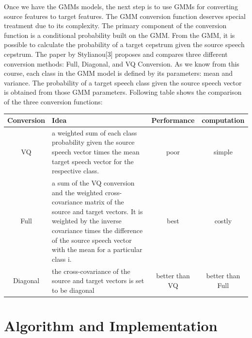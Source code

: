 \documentclass{article}
\begin{document}
Once we have the GMMs models, the next step is to use GMMs for converting source features to target features. The GMM conversion function deserves special treatment due to its complexity. The primary component of the conversion function is a conditional probability built on the GMM. From the GMM, it is possible to calculate the probability of a target cepstrum given the source speech cepstrum. The paper by Stylianou[3] proposes and compares three different conversion methods: Full, Diagonal, and VQ Conversion. As we know from this course, each class in the GMM model is defined by its parameters: mean and variance. The probability of a target speech class given the source speech vector is obtained from those GMM parameters. Following table shows the comparison of the three conversion functions:

\begin{center}
    \begin{tabular}{ | c | p{6.5cm}  | c | c |}
    \hline
    Conversion & Idea & Performance & computation\\ \hline
    VQ & a weighted sum of each class probability given the source speech vector times the mean target speech vector for the respective class. & poor & simple\\ \hline
    Full & a sum of the VQ conversion and the weighted cross-covariance matrix of the source and target vectors. It is weighted by the inverse covariance times the difference of the source speech vector with the mean for a particular class i. & best & costly\\ \hline
    Diagonal & the cross-covariance of the source and target vectors is set to be diagonal & better than VQ & better than Full\\ \hline
    \end{tabular}
\end{center}   

\section{Algorithm and Implementation}
\end{document}
